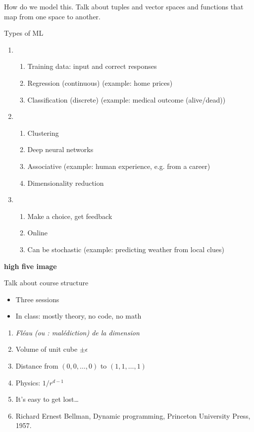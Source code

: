\documentclass{article}
\begin{document}
How do we model this.  Talk about tuples and vector spaces and
functions that map from one space to another.


Types of ML
\begin{enumerate}
\item {}
  \begin{enumerate}
  \item Training data: input and correct responses
  \item Regression (continuous) (example: home prices)
  \item Classification (discrete) (example: medical outcome (alive/dead))
  \end{enumerate}
\item {}
  \begin{enumerate}
  \item Clustering
  \item Deep neural networks
  \item Associative (example: human experience, e.g. from a career)
  \item Dimensionality reduction
  \end{enumerate}
\item {}
  \begin{enumerate}
  \item Make a choice, get feedback
  \item Online
  \item Can be stochastic (example: predicting weather from local clues)
  \end{enumerate}
\end{enumerate}

\textbf{high five image}

Talk about course structure
\begin{itemize}
\item Three sessions
\item In class: mostly theory, no code, no math %
\end{itemize}

\begin{enumerate}
\item \textit{Fléau (ou : malédiction) de la dimension}
\item Volume of unit cube $\pm\epsilon$
\item Distance from $(0,0,\ldots,0)$ to $(1,1,\ldots,1)$
\item Physics: $1/r^{d-1}$
\item It's easy to get lost\dots
\item Richard Ernest Bellman, Dynamic programming, Princeton
  University Press, 1957.
\end{enumerate}
\end{document}

